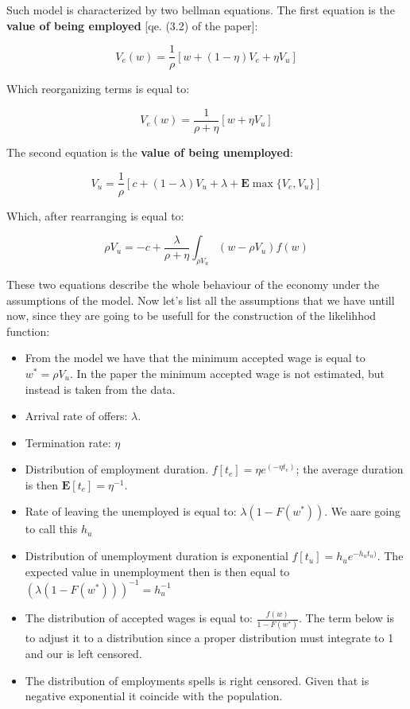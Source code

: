 \documentclass[]{book}
\begin{document}
Such model is characterized by two bellman equations. The first equation
is the \textbf{value of being employed} {[}qe. (3.2) of the paper{]}:

\[ V_e(w) =  \frac{1}{\rho}[w + (1-\eta)V_e + \eta V_u]\]

Which reorganizing terms is equal to:

\[V_e(w) = \frac{1}{\rho + \eta}[w + \eta V_u ]\]

The second equation is the \textbf{value of being unemployed}:

\[V_u = \frac{1}{\rho}[c+(1-\lambda)V_u+ \lambda + \mathbf{E} \max \lbrace V_e, V_u \rbrace]\]

Which, after rearranging is equal to:

\[\rho V_u = -c + \frac{\lambda}{\rho + \eta} \int_{\rho V_u}(w-\rho V_u)f(w)\]

These two equations describe the whole behaviour of the economy under
the assumptions of the model. Now let's list all the assumptions that we
have untill now, since they are going to be usefull for the construction
of the likelihhod function:

\begin{itemize}
\item
  From the model we have that the minimum accepted wage is equal to
  \(w^* = \rho V_u\). In the paper the minimum accepted wage is not
  estimated, but instead is taken from the data.
\item
  Arrival rate of offers: \(\lambda\).
\item
  Termination rate: \(\eta\)
\item
  Distribution of employment duration. \(f[t_e]= \eta e^{(-\eta t_e)}\);
  the average duration is then \(\mathbf{E}[t_e]= \eta^{-1}\).
\item
  Rate of leaving the unemployed is equal to: \(\lambda (1- F(w^*))\).
  We aare going to call this \(h_u\)
\item
  Distribution of unemployment duration is exponential
  \(f[t_u]= h_u e^{-h_u t_u)}\). The expected value in unemployment then
  is then equal to \((\lambda (1- F(w^*)))^{-1}=h_u^{-1}\)
\item
  The distribution of accepted wages is equal to:
  \(\frac{f(w)}{1 - F(w^*)}\). The term below is to adjust it to a
  distribution since a proper distribution must integrate to 1 and our
  is left censored.
\item
  The distribution of employments spells is right censored. Given that
  is negative exponential it coincide with the population.
\end{itemize}
\end{document}
